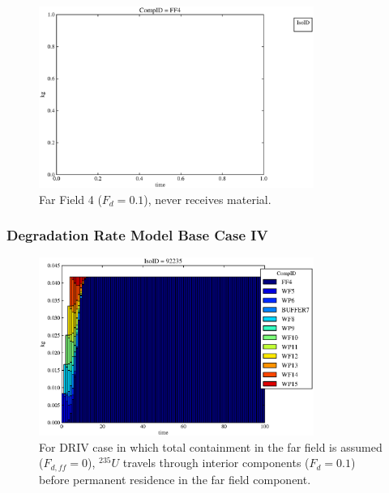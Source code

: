 \begin{frame}
\begin{figure}
\begin{minipage}[b]{0.45\linewidth}
  \includegraphics[width=0.8\textwidth]{./images/drIII0.eps}
  \caption[Case DRIII Waste Package Contaminants.]{ 
    Far Field 4 ($F_d = 0.1$), never receives material.
    }
  \label{fig:drIIIff0}


  \end{minipage}
\end{figure}
\end{frame}


\begin{frame}[ctb!]
  \frametitle{Degradation Rate Model Base Case IV}

\begin{figure}[ht]
\centering
\includegraphics[width=0.8\textwidth]{./images/drIV.eps}
\caption[$^{235}U$ residence. Degradation Rate Buffer No Release.]{
For DRIV case in which total containment in the far field is assumed ($F_{d,ff}=0$), 
$^{235}U$ travels through interior components ($F_d = 0.1$) before 
permanent residence in the far field component.
}
\label{fig:drIVall}
\end{figure}
\end{frame}

